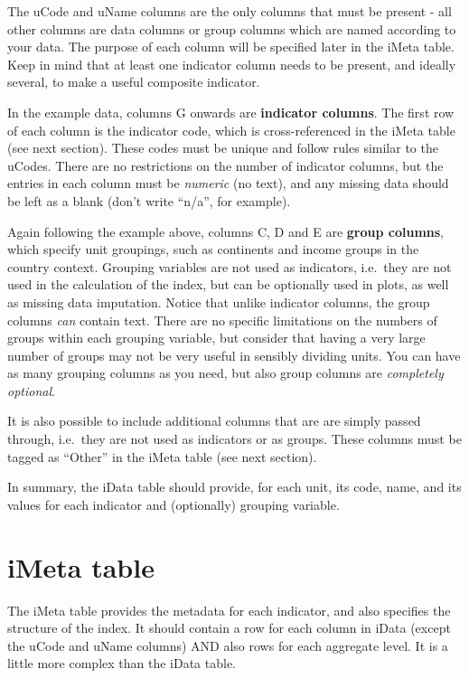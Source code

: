 \documentclass[
  letterpaper,
  DIV=11,
  numbers=noendperiod]{scrreprt}
\begin{document}
The uCode and uName columns are the only columns that must be present -
all other columns are data columns or group columns which are named
according to your data. The purpose of each column will be specified
later in the iMeta table. Keep in mind that at least one indicator
column needs to be present, and ideally several, to make a useful
composite indicator.

In the example data, columns G onwards are \textbf{indicator columns}.
The first row of each column is the indicator code, which is
cross-referenced in the iMeta table (see next section). These codes must
be unique and follow rules similar to the uCodes. There are no
restrictions on the number of indicator columns, but the entries in each
column must be \emph{numeric} (no text), and any missing data should be
left as a blank (don't write ``n/a'', for example).

Again following the example above, columns C, D and E are \textbf{group
columns}, which specify unit groupings, such as continents and income
groups in the country context. Grouping variables are not used as
indicators, i.e.~they are not used in the calculation of the index, but
can be optionally used in plots, as well as missing data imputation.
Notice that unlike indicator columns, the group columns \emph{can}
contain text. There are no specific limitations on the numbers of groups
within each grouping variable, but consider that having a very large
number of groups may not be very useful in sensibly dividing units. You
can have as many grouping columns as you need, but also group columns
are \emph{completely optional}.

It is also possible to include additional columns that are are simply
passed through, i.e.~they are not used as indicators or as groups. These
columns must be tagged as ``Other'' in the iMeta table (see next
section).

In summary, the iData table should provide, for each unit, its code,
name, and its values for each indicator and (optionally) grouping
variable.

\hypertarget{imeta-table}{%
\section{iMeta table}\label{imeta-table}}

The iMeta table provides the metadata for each indicator, and also
specifies the structure of the index. It should contain a row for each
column in iData (except the uCode and uName columns) AND also rows for
each aggregate level. It is a little more complex than the iData table.
\end{document}
